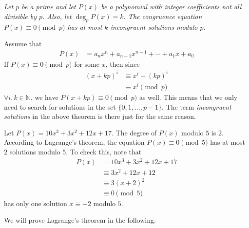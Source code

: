 \documentclass[12pt]{subfile}
\begin{document}
		\begin{theorem}\slshape\label{thm:lagrange}
			Let $p$ be a prime and let $P(x)$ be a polynomial with integer coefficients not all divisible by $p$. Also, let $\deg_p P(x) = k$. The congruence equation $P(x)\equiv0\pmod p$ has at most $k$ incongruent solutions modulo $p$.
		\end{theorem}

		\begin{note}
			Assume that
				\begin{align*}
					P(x)
						& =a_nx^n + a_{n-1}x^{n-1} + \cdots + a_1 x +a_0
				\end{align*}
			If $P(x) \equiv 0 \pmod p$ for some $x$, then since
				\begin{align*}
					(x+kp)^i
						& \equiv x^i + (kp)^i\\
						& \equiv x^i \pmod p
				\end{align*}
			$\forall i,k \in \mathbb N$, we have $P(x+kp) \equiv 0 \pmod p$ as well. This means that we only need to search for solutions in the set $\{0, 1, \ldots, p-1\}$. The term \textit{incongruent solutions} in the above theorem is there just for the same reason.
		\end{note}


		\begin{example}
			Let $P(x)=10x^3+3x^2 + 12x+17$.  The degree of $P(x)$ modulo $5$ is $2$. According to Lagrange's theorem, the equation $P(x) \equiv 0 \pmod 5$ has at most $2$ solutions modulo $5$. To check this, note that
				\begin{align*}
					P(x)
						& = 10x^3+3x^2 + 12x+17\\
						& \equiv 3x^2 + 12x+12\\
						& \equiv 3(x+2)^2\\
						& \equiv 0 \pmod 5
				\end{align*}
			has only one solution $x \equiv -2$ modulo $5$.
		\end{example}

	We will prove Lagrange's theorem in the following.
\end{document}
